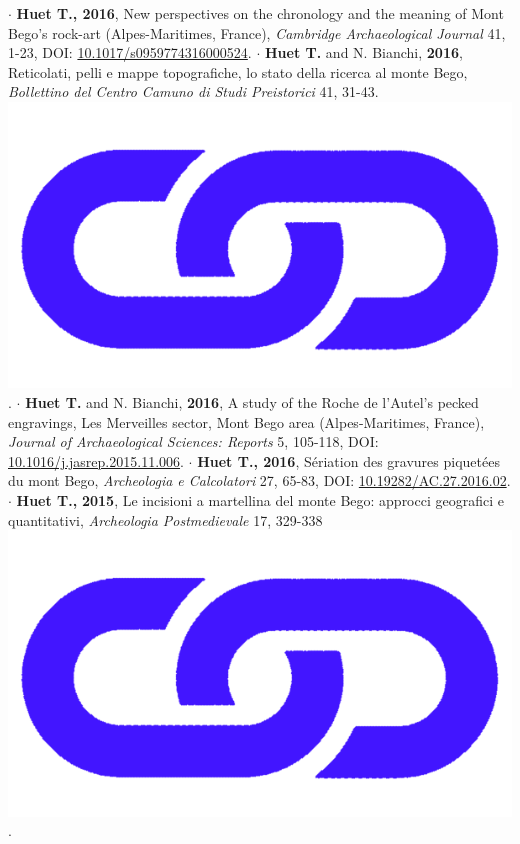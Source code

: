\documentclass{article}
\begin{document}
$\cdot$ \textbf{Huet T., 2016}, New perspectives on the chronology and the meaning of Mont Bego's rock-art (Alpes-Maritimes, France), \textit{Cambridge Archaeological Journal} 41, 1-23, DOI: \href{https://doi.org/10.1017/s0959774316000524}{10.1017/s0959774316000524}.
\smallbreak
$\cdot$ \textbf{Huet T.} and N. Bianchi, \textbf{2016}, Reticolati, pelli e mappe topografiche, lo stato della ricerca al monte Bego, \textit{Bollettino del Centro Camuno di Studi Preistorici} 41, 31-43. \href{https://www.researchgate.net/publication/358896027_Reticolati_pelli_e_mappe_topografiche}{\includegraphics[scale=0.02]{link_darkblue.png}}.
\smallbreak
$\cdot$ \textbf{Huet T.} and N. Bianchi, \textbf{2016}, A study of the Roche de l'Autel's pecked engravings, Les Merveilles sector, Mont Bego area (Alpes-Maritimes, France), \textit{Journal of Archaeological Sciences: Reports} 5, 105-118, DOI: \href{https://doi.org/10.1016/j.jasrep.2015.11.006}{10.1016/j.jasrep.2015.11.006}.
\smallbreak
$\cdot$ \textbf{Huet T., 2016}, S\'{e}riation des gravures piquet\'{e}es du mont Bego, \textit{Archeologia e Calcolatori} 27, 65-83, DOI: \href{https://doi.org/10.19282/AC.27.2016.02}{10.19282/AC.27.2016.02}.
\smallbreak
$\cdot$ \textbf{Huet T.,} \textbf{2015}, Le incisioni a martellina del monte Bego: approcci geografici e quantitativi, \textit{Archeologia Postmedievale} 17, 329-338 \href{https://www.insegnadelgiglio.it/wp-content/uploads/2015/01/APM_17_libro-anteprima.pdf}{\includegraphics[scale=0.02]{link_darkblue.png}}.
\end{document}
